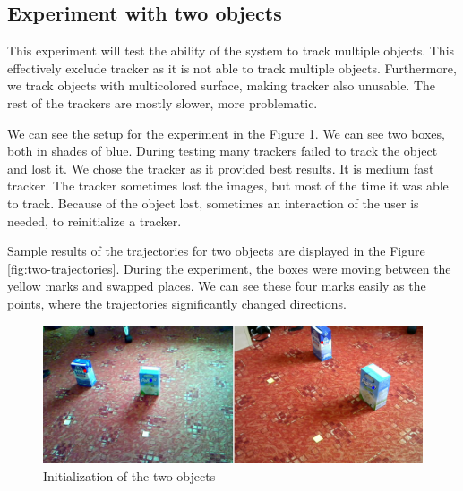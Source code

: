\subsection{Experiment with two objects}

This experiment will test the ability of the system to track multiple objects.
This effectively exclude \simback{} tracker as it is not able to track multiple
objects. Furthermore, we track objects with multicolored surface, making \hsv
tracker also unusable. The rest of the trackers are mostly slower, more
problematic.

We can see the setup for the experiment in the Figure \ref{fig:two-init}. We
can see two boxes, both in shades of blue. During testing many trackers failed
to track the object and lost it. We chose the \corr{} tracker as it provided
best results. It is medium fast tracker. The tracker sometimes lost the
images, but most of the time it was able to track. Because of the object lost,
sometimes an interaction of the user is needed, to reinitialize a tracker.

Sample results of the trajectories for two objects are displayed in the Figure
\ref{fig:two-trajectories}. During the experiment, the boxes were moving
between the yellow marks and swapped places. We can see these four marks easily
as the points, where the trajectories significantly changed directions. 

\begin{figure}[p]
\includegraphics[width=\linewidth]{img/experiments/two-objects.png}
\caption{Initialization of the two objects}
\label{fig:two-init}
\end{figure}

